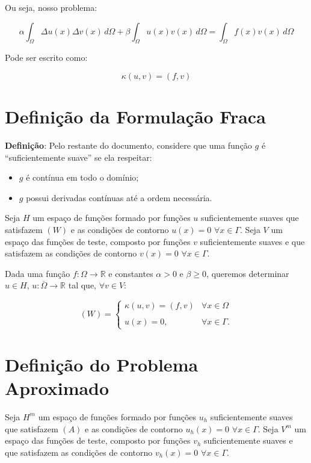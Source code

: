   Ou seja, nosso problema:

  \[\alpha \int_{\Omega} \Delta u(x) \Delta v(x) \, d\Omega + \beta \int_{\Omega} u(x)v(x) \, d\Omega = \int_{\Omega} f(x)v(x) \, d\Omega\]

  Pode ser escrito como:

  \[\kappa(u,v) = (f,v)\]

\section{Definição da Formulação Fraca}

  \textbf{Definição}: Pelo restante do documento, considere que uma função $g$ é ``suficientemente suave'' se ela respeitar:
  \begin{itemize}
    \item $g$ é contínua em todo o domínio;
    \item $g$ possui derivadas contínuas até a ordem necessária.
  \end{itemize}

  Seja $H$ um espaço de funções formado por funções $u$ suficientemente suaves que satisfazem $(W)$ e as condições de contorno $u(x) = 0$ $\forall x \in \Gamma$. Seja $V$ um espaço das funções de teste, composto por funções $v$ suficientemente suaves e que satisfazem as condições de contorno $v(x) = 0$ $\forall x \in \Gamma$.

  Dada uma função $f: \Omega \to \mathbb{R}$ e constantes $\alpha > 0$ e $\beta \geq 0$, queremos determinar $u \in H$, $u : \overline{\Omega} \to \mathbb{R}$ tal que, $\forall v \in V$:

  \[(W) = \begin{cases}
    \kappa(u,v) = (f,v) &\forall x \in \Omega \\\\
    u(x) = 0 ,\quad &\forall x \in \Gamma.
  \end{cases}\]


\section{Definição do Problema Aproximado}

Seja $H^m$ um espaço de funções formado por funções $u_h$ suficientemente suaves que satisfazem $(A)$ e as condições de contorno $u_h(x) = 0$ $\forall x \in \Gamma$. Seja $V^m$ um espaço das funções de teste, composto por funções $v_h$ suficientemente suaves e que satisfazem as condições de contorno $v_h(x) = 0$ $\forall x \in \Gamma$.

